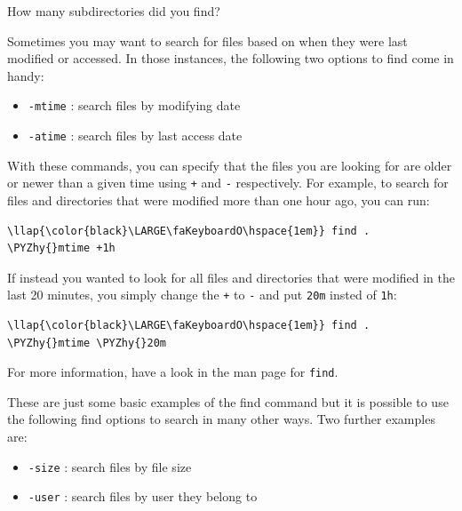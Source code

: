 \documentclass[11pt]{article}
\providecommand{\tightlist}{%
      \setlength{\itemsep}{0pt}\setlength{\parskip}{0pt}}
\def\PYZhy{\char`\-}
\begin{document}
    How many subdirectories did you find?

    Sometimes you may want to search for files based on when they were last
modified or accessed. In those instances, the following two options to
find come in handy:

\begin{itemize}
\tightlist
\item
  \texttt{-mtime} : search files by modifying date
\item
  \texttt{-atime} : search files by last access date
\end{itemize}

With these commands, you can specify that the files you are looking for
are older or newer than a given time using \texttt{+} and \texttt{-}
respectively. For example, to search for files and directories that were
modified more than one hour ago, you can run:

\begin{terminalinput}
\begin{Verbatim}[commandchars=\\\{\}]
\llap{\color{black}\LARGE\faKeyboardO\hspace{1em}} find . \PYZhy{}mtime +1h
\end{Verbatim}
\end{terminalinput}

    If instead you wanted to look for all files and directories that were
modified in the last 20 minutes, you simply change the \texttt{+} to
\texttt{-} and put \texttt{20m} insted of \texttt{1h}:

\begin{terminalinput}
\begin{Verbatim}[commandchars=\\\{\}]
\llap{\color{black}\LARGE\faKeyboardO\hspace{1em}} find . \PYZhy{}mtime \PYZhy{}20m
\end{Verbatim}
\end{terminalinput}

    For more information, have a look in the man page for \texttt{find}.

These are just some basic examples of the find command but it is
possible to use the following find options to search in many other ways.
Two further examples are:

\begin{itemize}
\tightlist
\item
  \texttt{-size} : search files by file size
\item
  \texttt{-user} : search files by user they belong to
\end{itemize}
\end{document}
